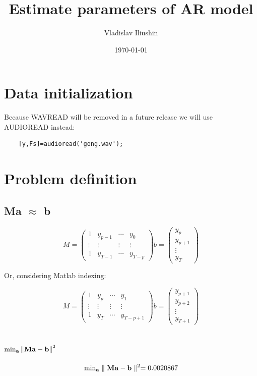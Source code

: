 \documentclass[a4paper]{article}
\title{Estimate parameters of AR model}
\author{Vladislav Iliushin}
\date{\today}
\begin{document}
 
\maketitle

\section{Data initialization} Because WAVREAD will be removed in a future release we will use AUDIOREAD instead: 
\begin{verbatim}
	[y,Fs]=audioread('gong.wav'); 
\end{verbatim}

\section{Problem definition} 
\subsection{Ma $\approx{}$ b}

\[ \left. M =
\begin{pmatrix}
	1 & y_{p-1}& \cdots& y_{0} \\
	\vdots & \vdots& \vdots & \vdots \\
	1 & y_{T-1} & \cdots & y_{T-p} 
\end{pmatrix}
\right.

%
\left. b =
\begin{pmatrix}
	y_{p}\\
	y_{p+1}\\
	\vdots \\
	y_{T} 
\end{pmatrix}
\right. \]

Or, considering Matlab indexing:

\[ \left. M =
\begin{pmatrix}
	1 & y_{p}& \cdots& y_{1} \\
	\vdots & \vdots& \vdots & \vdots \\
	1 & y_{T} & \cdots & y_{T-p+1} 
\end{pmatrix}
\right.

%
\left. b =
\begin{pmatrix}
	y_{p+1}\\
	y_{p+2}\\
	\vdots \\
	y_{T+1} 
\end{pmatrix}
\right. \]

\subsection{ $\textup{min}_{\mathbf{a}} \left \| \mathbf{ Ma-b }\right \|^{2} $}
\[\textup{min}_{\mathbf{a}} \parallel\mathbf{ Ma-b }\parallel^{2} = 0.0020867\]
\end{document}
